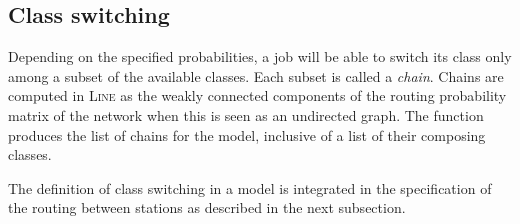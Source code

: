 \subsection{Class switching}
\label{class-switching}

Depending on the specified probabilities, a job will be able to switch its class only among a subset of the available classes. Each subset is called a {\em chain}. Chains are computed in \textsc{Line} as the weakly connected components of the routing probability matrix of the network when this is seen as an undirected graph. The function  produces the list of chains for the model, inclusive of a list of their composing classes.

The definition of class switching in a model is integrated in the specification of the routing between stations as described in the next subsection.

